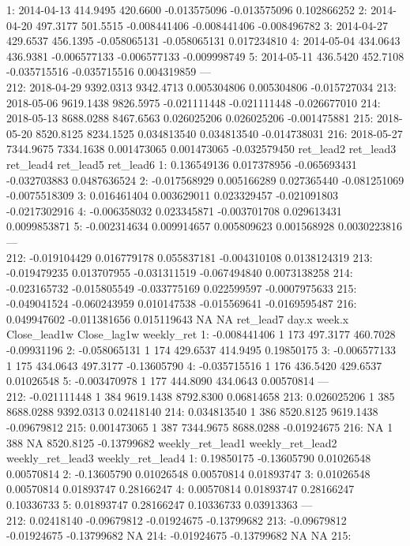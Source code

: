 \documentclass[
]{article}
\begin{document}
1: 2014-04-13 414.9495 420.6600 -0.013575096 -0.013575096 0.102866252 2:
2014-04-20 497.3177 501.5515 -0.008441406 -0.008441406 -0.008496782 3:
2014-04-27 429.6537 456.1395 -0.058065131 -0.058065131 0.017234810 4:
2014-05-04 434.0643 436.9381 -0.006577133 -0.006577133 -0.009998749 5:
2014-05-11 436.5420 452.7108 -0.035715516 -0.035715516 0.004319859 ---\\
212: 2018-04-29 9392.0313 9342.4713 0.005304806 0.005304806 -0.015727034
213: 2018-05-06 9619.1438 9826.5975 -0.021111448 -0.021111448
-0.026677010 214: 2018-05-13 8688.0288 8467.6563 0.026025206 0.026025206
-0.001475881 215: 2018-05-20 8520.8125 8234.1525 0.034813540 0.034813540
-0.014738031 216: 2018-05-27 7344.9675 7334.1638 0.001473065 0.001473065
-0.032579450 ret\_lead2 ret\_lead3 ret\_lead4 ret\_lead5 ret\_lead6 1:
0.136549136 0.017378956 -0.065693431 -0.032703883 0.0487636524 2:
-0.017568929 0.005166289 0.027365440 -0.081251069 -0.0075518309 3:
0.016461404 0.003629011 0.023329457 -0.021091803 -0.0217302916 4:
-0.006358032 0.023345871 -0.003701708 0.029613431 0.0099853871 5:
-0.002314634 0.009914657 0.005809623 0.001568928 0.0030223816 ---\\
212: -0.019104429 0.016779178 0.055837181 -0.004310108 0.0138124319 213:
-0.019479235 0.013707955 -0.031311519 -0.067494840 0.0073138258 214:
-0.023165732 -0.015805549 -0.033775169 0.022599597 -0.0007975633 215:
-0.049041524 -0.060243959 0.010147538 -0.015569641 -0.0169595487 216:
0.049947602 -0.011381656 0.015119643 NA NA ret\_lead7 day.x week.x
Close\_lead1w Close\_lag1w weekly\_ret 1: -0.008441406 1 173 497.3177
460.7028 -0.09931196 2: -0.058065131 1 174 429.6537 414.9495 0.19850175
3: -0.006577133 1 175 434.0643 497.3177 -0.13605790 4: -0.035715516 1
176 436.5420 429.6537 0.01026548 5: -0.003470978 1 177 444.8090 434.0643
0.00570814 ---\\
212: -0.021111448 1 384 9619.1438 8792.8300 0.06814658 213: 0.026025206
1 385 8688.0288 9392.0313 0.02418140 214: 0.034813540 1 386 8520.8125
9619.1438 -0.09679812 215: 0.001473065 1 387 7344.9675 8688.0288
-0.01924675 216: NA 1 388 NA 8520.8125 -0.13799682 weekly\_ret\_lead1
weekly\_ret\_lead2 weekly\_ret\_lead3 weekly\_ret\_lead4 1: 0.19850175
-0.13605790 0.01026548 0.00570814 2: -0.13605790 0.01026548 0.00570814
0.01893747 3: 0.01026548 0.00570814 0.01893747 0.28166247 4: 0.00570814
0.01893747 0.28166247 0.10336733 5: 0.01893747 0.28166247 0.10336733
0.03913363 ---\\
212: 0.02418140 -0.09679812 -0.01924675 -0.13799682 213: -0.09679812
-0.01924675 -0.13799682 NA 214: -0.01924675 -0.13799682 NA NA 215:
\end{document}

